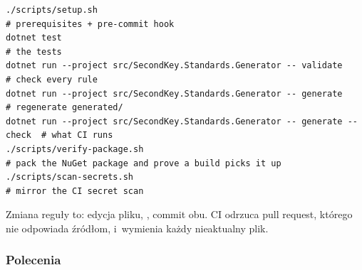 \begin{lstlisting}
./scripts/setup.sh                                                          # prerequisites + pre-commit hook
dotnet test                                                                 # the tests
dotnet run --project src/SecondKey.Standards.Generator -- validate          # check every rule
dotnet run --project src/SecondKey.Standards.Generator -- generate          # regenerate generated/
dotnet run --project src/SecondKey.Standards.Generator -- generate --check  # what CI runs
./scripts/verify-package.sh                                                 # pack the NuGet package and prove a build picks it up
./scripts/scan-secrets.sh                                                   # mirror the CI secret scan
\end{lstlisting}

Zmiana reguły to: edycja pliku, , commit obu. CI odrzuca pull request,
którego  nie odpowiada źródłom, i~wymienia każdy nieaktualny plik.

\subsubsection{Polecenia}

